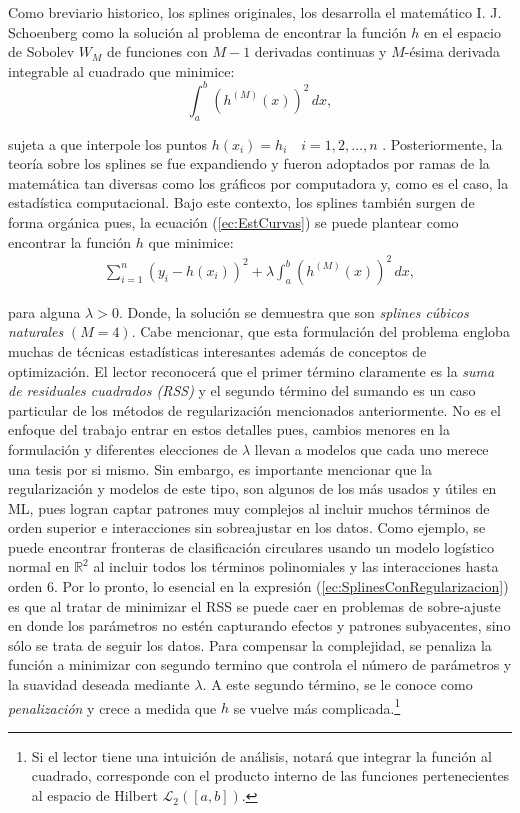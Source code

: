 \documentclass[../../Main/Main.tex]{subfiles}
\begin{document}
Como breviario historico, los splines originales, los desarrolla  el matemático I. J. Schoenberg como la solución al problema de encontrar la función $h$ en el espacio de Sobolev $W_{M}$ de funciones con $M-1$ derivadas continuas y $M$-ésima derivada integrable al cuadrado que minimice:
$$\int_a^b(h^{(M)}(x))^2\,dx,$$ 

sujeta a que interpole los puntos $h(x_i) = h_i \quad i = 1,2,\ldots,n$ \autocite{schoenberg1964spline}. Posteriormente, la teoría sobre los splines se fue expandiendo y fueron adoptados por ramas de la matemática tan diversas como los gráficos por computadora y, como es el caso, la estadística computacional. Bajo este contexto, los splines también surgen de forma orgánica pues, la ecuación (\ref{ec:EstCurvas}) se puede plantear como encontrar la función $h$ que minimice:
\begin{align}
	\sum_{i=1}^n(y_i - h(x_i))^2 + \lambda\int_a^b (h^{(M)}(x))^2 \, dx, \label{ec:SplinesConRegularizacion}
\end{align}

para alguna $\lambda > 0$. Donde, la solución se demuestra que son \textit{splines cúbicos naturales} $(M = 4)$. Cabe mencionar, que esta formulación del problema engloba muchas de técnicas estadísticas interesantes además de conceptos de optimización. El lector reconocerá que el primer término claramente es la \textit{suma de residuales cuadrados (RSS)} y el segundo término del sumando es un caso particular de los métodos de regularización mencionados anteriormente. No es el enfoque del trabajo entrar en estos detalles pues, cambios menores en la formulación y diferentes elecciones de $\lambda$ llevan a modelos que cada uno merece una tesis por si mismo. Sin embargo, es importante mencionar que la regularización y modelos de este tipo, son algunos de los más usados y útiles en ML, pues logran captar patrones muy complejos al incluir muchos términos de orden superior e interacciones sin sobreajustar en los datos. Como ejemplo, se puede encontrar fronteras de clasificación circulares usando un modelo logístico normal en $\mathbb{R}^2$ al incluir todos los términos polinomiales y las interacciones hasta orden 6. Por lo pronto, lo esencial en la expresión (\ref{ec:SplinesConRegularizacion}) es que al tratar de minimizar el RSS se puede caer en problemas de sobre-ajuste en donde los parámetros no estén capturando efectos y patrones subyacentes, sino sólo se trata de seguir los datos. Para compensar la complejidad, se penaliza la función a minimizar con segundo termino que controla el número de parámetros y la suavidad deseada mediante $\lambda$. A este segundo término, se le conoce como \textit{penalización} y crece a medida que $h$ se vuelve más complicada.\footnote{Si el lector tiene una intuición de análisis, notará que integrar la función al cuadrado, corresponde con el producto interno de las funciones pertenecientes al espacio de Hilbert $\mathcal{L}_2([a,b])$.}
\end{document}
